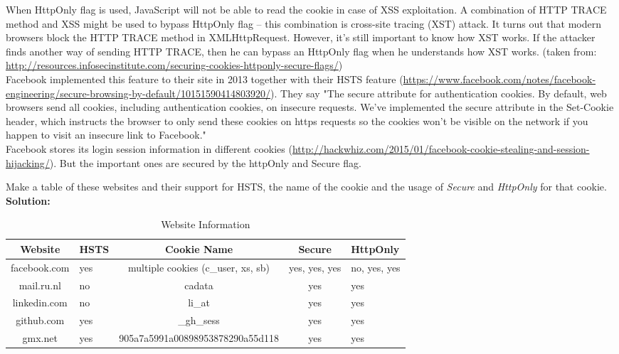 \documentclass[a4paper]{article}
\begin{document}
\begin{enumerate}
\begin{itemize}
		When HttpOnly flag is used, JavaScript will not be able to read the cookie in case of XSS exploitation. A combination of HTTP TRACE method and XSS might be used to bypass HttpOnly flag – this combination is cross-site tracing (XST) attack. It turns out that modern browsers block the HTTP TRACE method in XMLHttpRequest. However, it’s still important to know how XST works. If the attacker finds another way of sending HTTP TRACE, then he can bypass an HttpOnly flag when he understands how XST works. (taken from: \url{http://resources.infosecinstitute.com/securing-cookies-httponly-secure-flags/})\\
		
		Facebook implemented this feature to their site in 2013 together with their HSTS feature (\url{https://www.facebook.com/notes/facebook-engineering/secure-browsing-by-default/10151590414803920/}). They say "The secure attribute for authentication cookies. By default, web browsers send all cookies, including authentication cookies, on insecure requests. We’ve implemented the secure attribute in the Set-Cookie header, which instructs the browser to only send these cookies on https requests so the cookies won't be visible on the network if you happen to visit an insecure link to Facebook."\\
		
		Facebook stores its login session information in different cookies (\url{http://hackwhiz.com/2015/01/facebook-cookie-stealing-and-session-hijacking/}). But the important ones are secured by the httpOnly and Secure flag.
		
	\end{itemize}

Make a table of these websites and their support for HSTS, the name of the cookie and the usage of \textit{Secure} and \textit{HttpOnly} for that cookie.\\
\textbf{Solution:}\\

\begin{table}[h!]
\centering
\label{my-label}
\begin{tabular}{|c|l|c|c|l|}
\hline
\textbf{Website} & \textbf{HSTS} & \textbf{Cookie Name}  & \textbf{Secure} & \textbf{HttpOnly} \\ \hline
facebook.com  & yes &   multiple cookies (c\_user, xs, sb)  & yes, yes, yes                      & no, yes, yes \\ \hline
mail.ru.nl   & no &  cadata                     &   yes                    & yes  \\ \hline
linkedin.com  & no & li\_at                      &    yes                   & yes  \\ \hline
github.com  & yes &   	\_gh\_sess                    &  yes                     & yes  \\ \hline
gmx.net & yes & 905a7a5991a00898953878290a55d118 & yes & yes \\ \hline
\end{tabular}
\caption{Website Information}
\end{table}


\end{enumerate}
\end{document}
